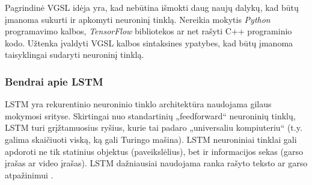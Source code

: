 \documentclass{VUMIFInfBakalaurinis}
\begin{document}
Pagrindinė VGSL idėja yra, kad nebūtina išmokti daug naujų dalykų, kad būtų įmanoma sukurti ir apkomyti neuroninį tinklą.
Nereikia mokytis \textit{Python} programavimo kalbos, \textit{TensorFlow} bibliotekos ar net rašyti C++ programinio kodo.
Užtenka įvaldyti VGSL kalbos sintaksines ypatybes, kad būtų įmanoma taisyklingai sudaryti neuroninį tinklą.

\subsubsection{Bendrai apie LSTM}
LSTM yra rekurentinio neuroninio tinklo architektūra naudojama gilaus mokymosi srityse.
Skirtingai nuo standartinių „feedforward“ neuroninių tinklų, LSTM turi grįžtamuosius ryšius, kurie tai padaro „universaliu kompiuteriu“ 
(t.y. galima skaičiuoti viską, ką gali Turingo mašina). LSTM neuroniniai tinklai gali apdoroti ne tik statinius objektus (paveikslėlius), 
bet ir informacijos sekas (garso įrašas ar video įrašas). LSTM dažniausiai naudojama ranka rašyto teksto ar garso atpažinimui \cite{hochreiter1997long}.
\end{document}
